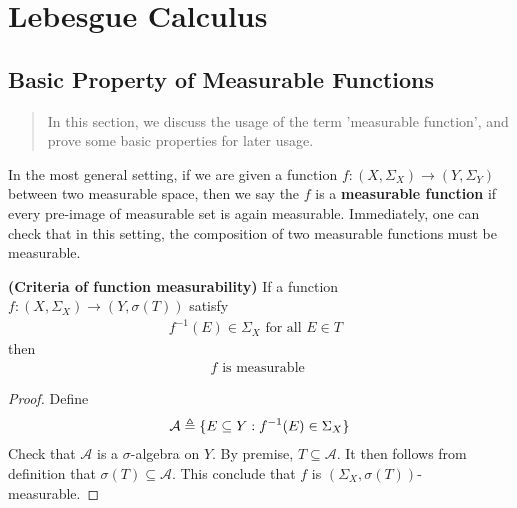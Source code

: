 \documentclass{report}
\begin{document}
\chapter{Lebesgue Calculus}
\section{Basic Property of Measurable Functions}
\begin{abstract}
In this section, we discuss the usage of the term 'measurable function', and prove some basic properties for later usage. 
\end{abstract}
\begin{mdframed}
  In the most general setting, if we are given a function $f:(X,\Sigma_X)\rightarrow (Y,\Sigma_Y)$ between two measurable space, then we say the $f$ is a \textbf{measurable function} if every pre-image of measurable set is again measurable. Immediately, one can check that in this setting, the composition of two measurable functions must be measurable.
\end{mdframed}
\begin{theorem}
\label{EDm}
\textbf{(Criteria of function measurability)} If a function $f:(X,\Sigma_X)\rightarrow (Y,\sigma (T))$ satisfy 
\begin{align*}
f^{-1}(E)\in \Sigma_X\text{ for all $E \in T$ }
\end{align*}
then 
\begin{align*}
f\text{ is measurable }
\end{align*}
\end{theorem}
\begin{proof}
Define 
\begin{align*}
\mathcal{A}\triangleq \{ E \subseteq Y: f^{-1}(E)\in \Sigma_X \}
\end{align*}
Check that $\mathcal{A}$ is a $\sigma$-algebra on $Y$. By premise, $T \subseteq \mathcal{A}$. It then follows from definition that $\sigma (T)\subseteq \mathcal{A}$. This conclude that $f$ is  $(\Sigma_X, \sigma(T))$-measurable. 
\end{proof}
\end{document}
